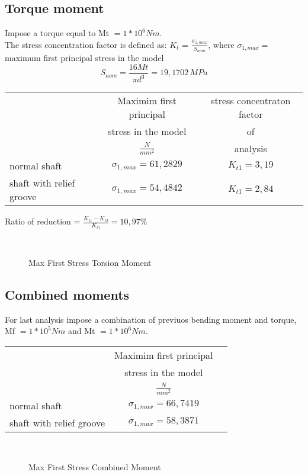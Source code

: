 \subsection{Torque moment}
Impose a torque equal to Mt $= 1 * 10^6 Nm$.\\
The stress concentration factor is defined as: $K_{t}$ = $\frac{\sigma_{1,max}}{S_{nom}}$, where $\sigma_{1,max}=$ maximum first principal stress in the model\\
\[S_{nom}= \frac{16Mt}{\pi d^3}=19,1702 \, MPa\]
\begin{table}[h]
\centering
\begin{tabular}{lcc}
\hline
& Maximim first principal  & stress concentraton factor\\
& stress in the model & of\\
& $\frac{N}{mm^2}$ &analysis\\
\hline
normal shaft & $\sigma_{1,max}=61,2829 $ &$K_{t1}=3,19$\\
shaft with relief groove & $\sigma_{1,max}= 54,4842$ &$K_{t1}=2,84$\\
\hline
\end{tabular}
\end{table}
Ratio of reduction = $\frac{K_{t1}-K_{t2}}{K_{t1}}= 10,97\%$
\begin{figure}[!h]
\centering
{} \,
\caption{Max First Stress Torsion Moment}
\label{img:HW7-MFTM}
\end{figure}
\pagebreak
\newpage
\subsection{Combined moments}
For last analysis impose a combination of previuos bending moment and torque, Mf $= 1* 10^5 Nm$ and Mt $= 1 * 10^6 Nm$.
\begin{table}[h]
\centering
\begin{tabular}{lcc}
\hline
& Maximim first principal\\
& stress in the model\\
& $\frac{N}{mm^2}$\\
\hline
normal shaft & $\sigma_{1,max}= 66,7419$ \\
shaft with relief groove & $\sigma_{1,max}=58,3871 $\\
\hline
\end{tabular}
\end{table}
\begin{figure}[!h]
\centering
{} \,
\caption{Max First Stress Combined Moment}
\label{img:HW7-MFCM}
\end{figure}\pagebreak
